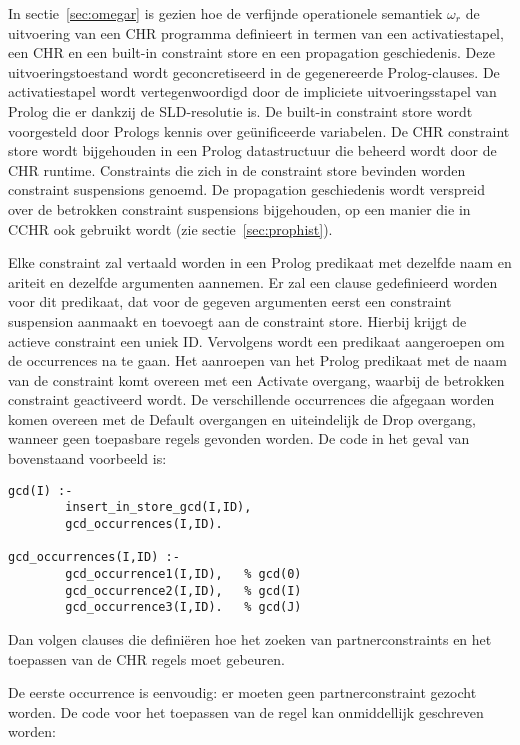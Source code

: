In sectie~\ref{sec:omegar} is gezien hoe de verfijnde operationele semantiek $\omega_r$ de uitvoering van een CHR programma definieert in termen van een activatiestapel, een CHR en een built-in constraint store en een propagation geschiedenis. Deze uitvoeringstoestand wordt geconcretiseerd in de gegenereerde Prolog-clauses. De activatiestapel wordt vertegenwoordigd door de impliciete uitvoeringsstapel van Prolog die er dankzij de SLD-resolutie is. De built-in constraint store wordt voorgesteld door Prologs kennis over ge\"unificeerde variabelen. De CHR constraint store wordt bijgehouden in een Prolog datastructuur die beheerd wordt door de CHR runtime. Constraints die zich in de constraint store bevinden worden constraint suspensions genoemd. De propagation geschiedenis wordt verspreid over de betrokken constraint suspensions bijgehouden, op een manier die in CCHR ook gebruikt wordt (zie sectie~\ref{sec:prophist}).

Elke constraint zal vertaald worden in een Prolog predikaat met dezelfde naam en ariteit en dezelfde argumenten aannemen. Er zal een clause gedefinieerd worden voor dit predikaat, dat voor de gegeven argumenten eerst een constraint suspension aanmaakt en toevoegt aan de constraint store. Hierbij krijgt de actieve constraint een uniek ID. Vervolgens wordt een predikaat aangeroepen om de occurrences na te gaan. Het aanroepen van het Prolog predikaat met de naam van de constraint komt overeen met een Activate overgang, waarbij de betrokken constraint geactiveerd wordt. De verschillende occurrences die afgegaan worden komen overeen met de Default overgangen en uiteindelijk de Drop overgang, wanneer geen toepasbare regels gevonden worden. De code in het geval van bovenstaand voorbeeld is:

{\scriptsize \begin{Verbatim}[frame=single]
gcd(I) :-
        insert_in_store_gcd(I,ID),
        gcd_occurrences(I,ID).

gcd_occurrences(I,ID) :-
        gcd_occurrence1(I,ID),   % gcd(0)
        gcd_occurrence2(I,ID),   % gcd(I)
        gcd_occurrence3(I,ID).   % gcd(J)
\end{Verbatim}
}

Dan volgen clauses die defini\"eren hoe het zoeken van partnerconstraints en het toepassen van de CHR regels moet gebeuren.

De eerste occurrence is eenvoudig: er moeten geen partnerconstraint gezocht worden. De code voor het toepassen van de regel kan onmiddellijk geschreven worden:

